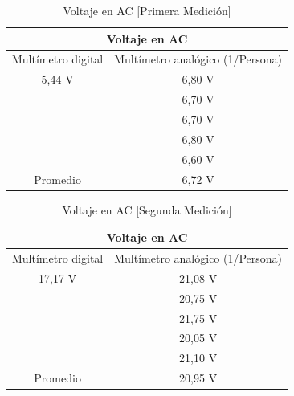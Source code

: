 \documentclass[letterpaper, 12pt]{report}
\begin{document}

\begin{table}[H]
	\begin{center}
		\begin{tabular}{|c|c|}
			\multicolumn{2}{c}{Voltaje en AC}                     \\ \hline
			Multímetro digital & Multímetro analógico (1/Persona) \\ \hline
			5,44 V             & 6,80 V                           \\
			                   & 6,70 V                           \\
			                   & 6,70 V                           \\
			                   & 6,80 V                           \\
			                   & 6,60 V                           \\ \hline
			Promedio           & 6,72 V                           \\ \hline
		\end{tabular}
		\caption{Voltaje en AC [Primera Medición]}
		\label{tab:voltajeAC_1}
	\end{center}
\end{table}

\begin{table}[H]
	\begin{center}
		\begin{tabular}{|c|c|}
			\multicolumn{2}{c}{Voltaje en AC}                     \\ \hline
			Multímetro digital & Multímetro analógico (1/Persona) \\ \hline
			17,17 V            & 21,08 V                          \\
			                   & 20,75 V                          \\
			                   & 21,75 V                          \\
			                   & 20,05 V                          \\
			                   & 21,10 V                          \\ \hline
			Promedio           & 20,95 V                          \\ \hline
		\end{tabular}
		\caption{Voltaje en AC [Segunda Medición]}
		\label{tab:voltajeAC_2}
	\end{center}
\end{table}
\end{document}
